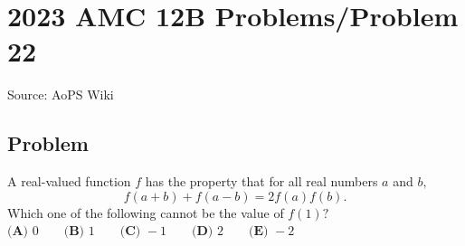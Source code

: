 \documentclass[12pt]{article}
\begin{document}
\section*{{2023 AMC 12B Problems/Problem 22}}
Source: AoPS Wiki

\subsection*{Problem}
A real-valued function $f$ has the property that for all real numbers $a$ and $b,$ \[f(a + b) + f(a - b) = 2f(a) f(b).\] Which one of the following cannot be the value of $f(1)?$ $\textbf{(A) } 0 \qquad \textbf{(B) } 1 \qquad \textbf{(C) } -1 \qquad \textbf{(D) } 2 \qquad \textbf{(E) } -2$
\end{document}
